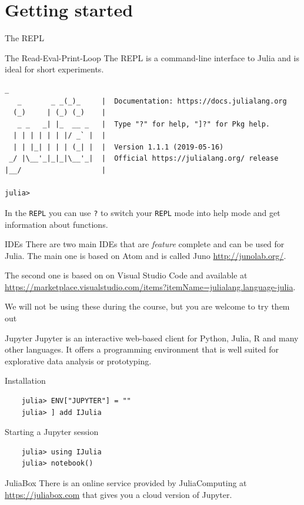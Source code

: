 \documentclass{beamer}
\begin{document}
\section{Getting started}
\begin{frame}[fragile]{The REPL}
  \begin{block}{The Read-Eval-Print-Loop}
    The REPL is a command-line interface to Julia and is ideal for short experiments.
    \begin{Verbatim}[fontsize=\footnotesize]
               _
   _       _ _(_)_     |  Documentation: https://docs.julialang.org
  (_)     | (_) (_)    |
   _ _   _| |_  __ _   |  Type "?" for help, "]?" for Pkg help.
  | | | | | | |/ _` |  |
  | | |_| | | | (_| |  |  Version 1.1.1 (2019-05-16)
 _/ |\__'_|_|_|\__'_|  |  Official https://julialang.org/ release
|__/                   |

julia> 

\end{Verbatim}

In the \verb|REPL| you can use \verb|?| to switch your \verb|REPL| mode into help mode and get information about functions.
  \end{block}
\end{frame}
\begin{frame}{IDEs}
  There are two main IDEs that are \emph{feature} complete and can be used for Julia. The main one is based on Atom and is called Juno \url{http://junolab.org/}.

\vspace{0.5cm}
  The second one is based on on Visual Studio Code and available at \url{https://marketplace.visualstudio.com/items?itemName=julialang.language-julia}.

\vspace{0.5cm}
  We will not be using these during the course, but you are welcome to try them out
\end{frame}
\begin{frame}[fragile]{Jupyter}
  Jupyter is an interactive web-based client for Python, Julia, R and many other languages.
  It offers a programming environment that is well suited for explorative data analysis or prototyping.
  \begin{block}{Installation}
  \begin{Verbatim}
    julia> ENV["JUPYTER"] = ""
    julia> ] add IJulia
    \end{Verbatim}
  \end{block}
  \begin{block}{Starting a Jupyter session}
    \begin{Verbatim}
    julia> using IJulia
    julia> notebook()
    \end{Verbatim}
  \end{block}
  \begin{block}{JuliaBox}
    There is an online service provided by JuliaComputing at \url{https://juliabox.com} that gives you a cloud version of Jupyter.
  \end{block}
\end{frame}
\end{document}

